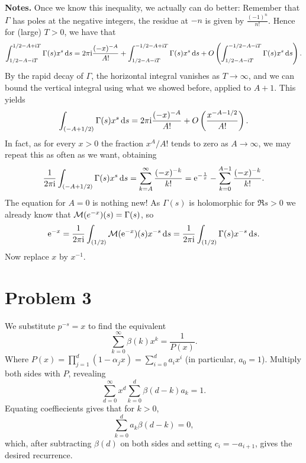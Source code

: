\documentclass[a4paper,11pt]{article}
\begin{document}
\textbf{Notes.}
Once we know this inequality, we actually can do better: Remember that $\Gamma$ has poles at
the negative integers, the residue at $-n$ is given by $\tfrac{(-1)^n}{n!}$. Hence for 
(large) $T > 0$, we have that 
\[
    \int_{1/2-A-\mathrm i T}^{1/2 - A +\mathrm i T} \Gamma(s) x^s \mathrm{\,d} s =
    2 \pi \mathrm i \frac{(-x)^{-A}}{A!} + \int_{1/2-A-\mathrm i T}^{-1/2 - A + \mathrm i T} \Gamma(s) x^s
    \mathrm{\,d} s + O\left( \int_{1/2-A-\mathrm i T}^{-1/2-A - \mathrm i T}  \Gamma(s) x^s \mathrm{\,d} s\right). 
\]
By the rapid decay of $\Gamma$, the horizontal integral vanishes as $T
\rightarrow \infty$, and we can bound the vertical integral using what we
showed before, applied to $A+1$. This yields
\[
    \int_{(-A+1/2)} \Gamma(s) x^s \mathrm{\,d} s = 2 \pi \mathrm i \frac{(-x)^{-A}}{A!} + O\left(\frac{x^{-A-1/2}}{A!}\right).
\]
In fact, as for every $x>0$ the fraction $x^A/A!$ tends to zero as $A \to \infty$, we
may repeat this as often as we want, obtaining
\[
    \frac 1{2 \pi \mathrm i} \int_{(-A+1/2)} \Gamma(s) x^s \mathrm{\,d} s = \sum_{k=A}^\infty \frac{(-x)^{-k}}{k!} 
    = \mathrm e^{-\frac 1x} - \sum_{k=0}^{A-1} \frac{(-x)^{-k}}{k!}.
\]
The equation for $A= 0$ is nothing new! As $\Gamma(s)$ is holomorphic
for $\Re s > 0$ we already know that $\mathcal{M}(e^{-x})(s) = \Gamma(s)$, so
\[
    \mathrm e^{-x} = \frac{1}{2 \pi \mathrm i} \int_{(1/2)} \mathcal{M}(\mathrm e^{-x})(s) x^{-s} \mathrm{\,d} s
    = \frac{1}{2 \pi \mathrm i} \int_{(1/2)} \Gamma(s) x^{-s} \mathrm{\,d} s.
\]
Now replace $x$ by $x^{-1}$. 

\section*{Problem 3}
We substitute $p^{-s} = x$ to find the equivalent
\[
    \sum_{k=0}^\infty \beta(k) x^k = \frac 1 {P(x)}. 
\]
Where $P(x) = \prod_{j=1}^d(1-\alpha_j x)= \sum_{i = 0}^d a_i x^i$ (in particular,
$a_0 = 1$). Multiply both sides with $P$, revealing
\[
    \sum_{d=0}^\infty x^d \sum_{k=0}^d \beta(d-k) a_k = 1.
\]
Equating coeffiecients gives that for $k>0$, 
\[
    \sum_{k=0}^d a_k \beta(d-k) = 0,
\]
which, after subtracting $\beta(d)$ on both sides and setting $c_i = -a_{i+1}$,
gives the desired recurrence.
\end{document}
